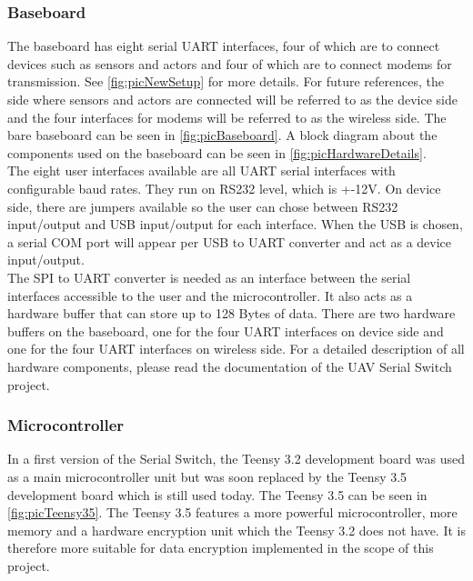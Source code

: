 \subsubsection{Baseboard}
%
%
The baseboard has eight serial UART interfaces, four of which are to connect devices such as sensors and actors and four of which are to connect modems for transmission. See \autoref{fig:picNewSetup} for more details. For future references, the side where sensors and actors are connected will be referred to as the device side and the four interfaces for modems will be referred to as the wireless side. The bare baseboard can be seen in \autoref{fig:picBaseboard}. A block diagram about the components used on the baseboard can be seen in \autoref{fig:picHardwareDetails}.\\
The eight user interfaces available are all UART serial interfaces with configurable baud rates. They run on RS232 level, which is +-12V. On device side, there are jumpers available so the user can chose between RS232 input/output and USB input/output for each interface. When the USB is chosen, a serial COM port will appear per USB to UART converter and act as a device input/output.\\
The SPI to UART converter is needed as an interface between the serial interfaces accessible to the user and the microcontroller. It also acts as a hardware buffer that can store up to 128 Bytes of data. There are two hardware buffers on the baseboard, one for the four UART interfaces on device side and one for the four UART interfaces on wireless side. For a detailed description of all hardware components, please read the documentation of the UAV Serial Switch project.
%
\subsubsection{Microcontroller}
%
In a first version of the Serial Switch, the Teensy 3.2 development board was used as a main microcontroller unit but was soon replaced by the Teensy 3.5 development board which is still used today. The Teensy 3.5 can be seen in \autoref{fig:picTeensy35}. The Teensy 3.5 features a more powerful microcontroller, more memory and a hardware encryption unit which the Teensy 3.2 does not have. It is therefore more suitable for data encryption implemented in the scope of this project.
%
